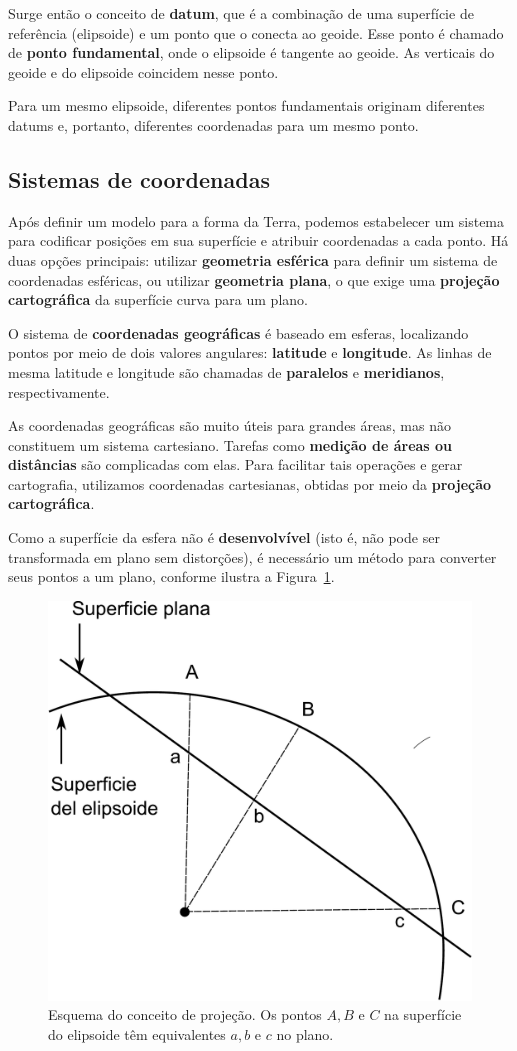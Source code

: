 Surge então o conceito de \textbf{datum}, que é a combinação de uma superfície de referência (elipsoide) e um ponto que o conecta ao geoide. Esse ponto é chamado de \textbf{ponto fundamental}, onde o elipsoide é tangente ao geoide. As verticais do geoide e do elipsoide coincidem nesse ponto.

Para um mesmo elipsoide, diferentes pontos fundamentais originam diferentes datums e, portanto, diferentes coordenadas para um mesmo ponto.

\subsection{Sistemas de coordenadas}

Após definir um modelo para a forma da Terra, podemos estabelecer um sistema para codificar posições em sua superfície e atribuir coordenadas a cada ponto. Há duas opções principais: utilizar \textbf{geometria esférica} para definir um sistema de coordenadas esféricas, ou utilizar \textbf{geometria plana}, o que exige uma \textbf{projeção cartográfica} da superfície curva para um plano.

O sistema de \textbf{coordenadas geográficas} é baseado em esferas, localizando pontos por meio de dois valores angulares: \textbf{latitude} e \textbf{longitude}. As linhas de mesma latitude e longitude são chamadas de \textbf{paralelos} e \textbf{meridianos}, respectivamente.

As coordenadas geográficas são muito úteis para grandes áreas, mas não constituem um sistema cartesiano. Tarefas como \textbf{medição de áreas ou distâncias} são complicadas com elas. Para facilitar tais operações e gerar cartografia, utilizamos coordenadas cartesianas, obtidas por meio da \textbf{projeção cartográfica}.

Como a superfície da esfera não é \textbf{desenvolvível} (isto é, não pode ser transformada em plano sem distorções), é necessário um método para converter seus pontos a um plano, conforme ilustra a Figura~\ref{Fig:Proyeccion}.

\begin{figure}
\centering
\includegraphics[width=.5\columnwidth]{Fundamentos_cartograficos/Proyeccion.pdf}
\caption{\small Esquema do conceito de projeção. Os pontos $A, B$ e $C$ na superfície do elipsoide têm equivalentes $a, b$ e $c$ no plano.}
\label{Fig:Proyeccion} 
\end{figure}

